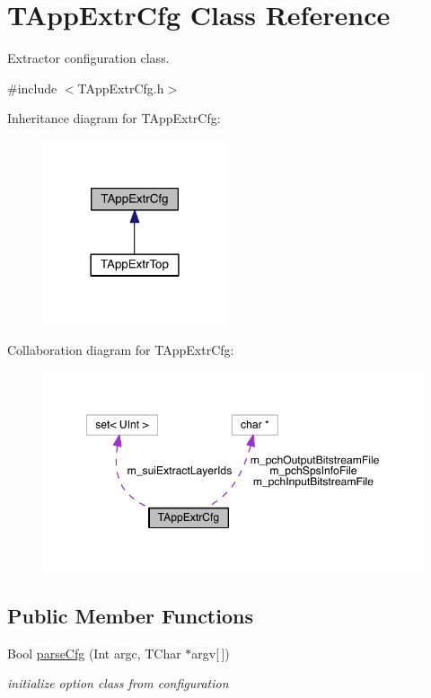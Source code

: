 \hypertarget{class_t_app_extr_cfg}{}\section{T\+App\+Extr\+Cfg Class Reference}
\label{class_t_app_extr_cfg}


Extractor configuration class.  




{\ttfamily \#include $<$T\+App\+Extr\+Cfg.\+h$>$}



Inheritance diagram for T\+App\+Extr\+Cfg\+:
\nopagebreak
\begin{figure}[H]
\begin{center}
\leavevmode
\includegraphics[width=153pt]{d8/dc2/class_t_app_extr_cfg__inherit__graph}
\end{center}
\end{figure}


Collaboration diagram for T\+App\+Extr\+Cfg\+:
\nopagebreak
\begin{figure}[H]
\begin{center}
\leavevmode
\includegraphics[width=349pt]{d8/db5/class_t_app_extr_cfg__coll__graph}
\end{center}
\end{figure}
\subsection*{Public Member Functions}
\begin{DoxyCompactItemize}
\item 
Bool \hyperlink{class_t_app_extr_cfg_a684a727a13a5ebc0ab43e5193237ff12}{parse\+Cfg} (Int argc, T\+Char $\ast$argv\mbox{[}$\,$\mbox{]})
\begin{DoxyCompactList}\small\item\em initialize option class from configuration \end{DoxyCompactList}\end{DoxyCompactItemize}
